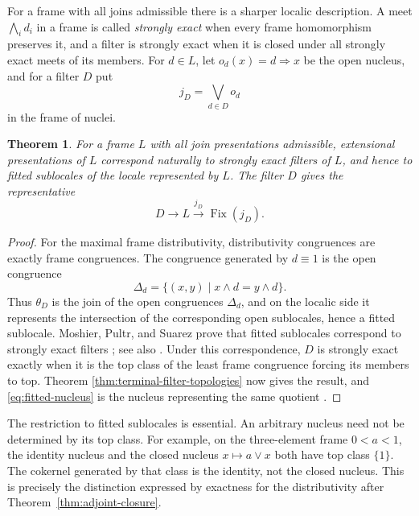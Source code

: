 \documentclass[12pt,oneside,reqno]{amsart}
\newtheorem{theorem}{Theorem}[section]
\theoremstyle{definition}
\theoremstyle{remark}
\begin{document}
For a frame with all joins admissible there is a sharper localic
description.  A meet \(\bigwedge_i d_i\) in a frame is called
\emph{strongly exact} when every frame homomorphism preserves it, and a
filter is strongly exact when it is closed under all strongly exact
meets of its members.  For \(d\in L\), let
\(o_d(x)=d\Rightarrow x\) be the open nucleus, and for a filter \(D\)
put
\begin{equation}\label{eq:fitted-nucleus}
                         j_D=\bigvee_{d\in D}o_d
\end{equation}
in the frame of nuclei.

\begin{theorem}\label{thm:frame-topologies}
For a frame \(L\) with all join presentations admissible, extensional
presentations of \(L\) correspond naturally to strongly exact filters of
\(L\), and
hence to fitted sublocales of the locale represented by \(L\).  The
filter \(D\) gives the representative
\[
 D\longrightarrow L
 \xrightarrow{\,j_D\,}\operatorname{Fix}(j_D)
 .
\]
\end{theorem}

\begin{proof}
For the maximal frame distributivity, distributivity congruences are
exactly frame congruences.  The congruence generated by \(d\equiv1\)
is the open congruence
\[
             \Delta_d=\{(x,y)\mid x\wedge d=y\wedge d\}.
\]
Thus \(\theta_D\) is the join of the open congruences \(\Delta_d\), and
on the localic side it represents the intersection of the corresponding
open sublocales, hence a fitted sublocale.  Moshier, Pultr, and Suarez
prove that fitted sublocales correspond to strongly exact filters
\cite{MoshierPultrSuarez}; see also \cite{JaklSuarez}.  Under this
correspondence, \(D\) is strongly exact exactly when it is the top class
of the least frame congruence forcing its members to top.  Theorem
\ref{thm:terminal-filter-topologies} now gives the result, and
\eqref{eq:fitted-nucleus} is the nucleus representing the same quotient
\cite{EscardoNuclei}.
\end{proof}

The restriction to fitted sublocales is essential.  An arbitrary
nucleus need not be determined by its top class.  For example, on the
three-element frame \(0<a<1\), the identity nucleus and the closed
nucleus \(x\mapsto a\vee x\) both have top class \(\{1\}\).  The
cokernel generated by that class is the identity, not the closed
nucleus.  This is precisely the distinction expressed by exactness for
the distributivity after Theorem~\ref{thm:adjoint-closure}.
\end{document}
